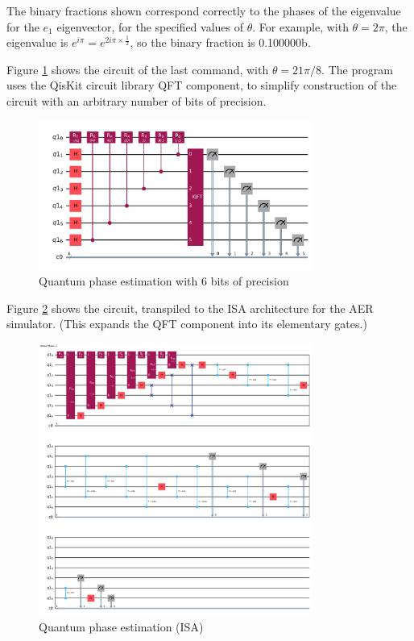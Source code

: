 \documentclass[12pt]{extarticle}
\begin{document}
The binary fractions shown correspond correctly to the phases of the eigenvalue for the $e_1$ eigenvector, for the specified values of $\theta$.
For example, with $\theta=2\pi$, the eigenvalue is $e^{i\pi}=e^{2i\pi\times\frac{1}{2}}$, so the binary fraction is 0.100000b.

Figure \ref{fig:qpe_rx_e1_21pi8} shows the circuit of the last command, with $\theta=21\pi/8$.
The program uses the QisKit circuit library QFT component, to simplify construction of the circuit with an arbitrary number of bits of precision.

\begin{figure}[H]
\centering
\includegraphics[width=0.80\textwidth]{images/homework3_q2_qpe_rx_e1_21pi8.png}
\caption{Quantum phase estimation with 6 bits of precision}
\label{fig:qpe_rx_e1_21pi8}
\end{figure}

Figure \ref{fig:qpe_rx_e1_21pi8_isa} shows the circuit, transpiled to the ISA architecture for the AER simulator.
(This expands the QFT component into its elementary gates.)

\begin{figure}[H]
\centering
\includegraphics[width=0.80\textwidth]{images/homework3_q2_qpe_rx_e1_21pi8_isa.png}
\caption{Quantum phase estimation (ISA)}
\label{fig:qpe_rx_e1_21pi8_isa}
\end{figure}
\end{document}

